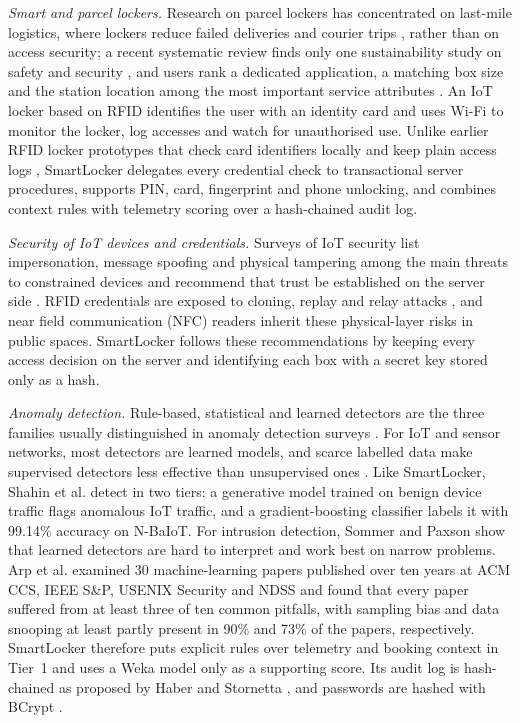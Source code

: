 \documentclass[journal,onecolumn]{IEEEtran}
\begin{document}
\textit{Smart and parcel lockers.} Research on parcel lockers has concentrated on last-mile logistics, where lockers
reduce failed deliveries and courier trips \cite{iwan2016parcel}, rather than on access security; a recent systematic
review finds only one sustainability study on safety and security \cite{zhang2025parcel}, and users rank a dedicated
application, a matching box size and the station location among the most important service attributes
\cite{ciesla2023parcel}. An IoT
locker based on RFID \cite{rfidiot2023locker} identifies the user with an identity card and uses Wi-Fi to monitor the
locker, log accesses and watch for unauthorised use. Unlike earlier RFID locker prototypes that check card identifiers
locally and keep plain access logs \cite{rfidiot2023locker}, SmartLocker delegates every credential check to
transactional server procedures, supports PIN, card, fingerprint and phone unlocking, and combines context rules with
telemetry scoring over a hash-chained audit log.

\textit{Security of IoT devices and credentials.} Surveys of IoT security list impersonation, message spoofing and
physical tampering among the main threats to constrained devices \cite{roman2013features} and recommend that trust be
established on the server side \cite{sicari2015security}. RFID credentials are exposed to cloning, replay and relay
attacks \cite{mitrokotsa2010rfid}, and near field communication (NFC) readers inherit these physical-layer risks in
public spaces. SmartLocker follows these recommendations by keeping every
access decision on the server and identifying each box with a secret key stored only as a hash.

\textit{Anomaly detection.} Rule-based, statistical and learned detectors are the three families usually distinguished
in anomaly detection surveys \cite{chandola2009anomaly}. For IoT and sensor networks, most detectors are learned
models, and scarce labelled data make supervised detectors less effective than unsupervised ones
\cite{demedeiros2023anomaly}. Like SmartLocker, Shahin et al. \cite{shahin2025twostage} detect in two
tiers: a generative model trained on benign device traffic flags anomalous IoT traffic, and a gradient-boosting
classifier labels it with 99.14\% accuracy on N-BaIoT. For intrusion detection, Sommer and Paxson
\cite{sommer2010outside} show that learned detectors are hard to interpret and work best on narrow problems. Arp et
al. \cite{arp2022dos} examined 30 machine-learning papers published over ten years at ACM CCS, IEEE S\&P, USENIX
Security and NDSS and found that every paper suffered from at least three of ten common pitfalls, with sampling bias
and data snooping at least partly present in 90\% and 73\% of the papers, respectively. SmartLocker therefore puts
explicit rules over telemetry and booking context in Tier~1 and uses a Weka model \cite{hall2009weka} only as a
supporting score. Its audit log is hash-chained as proposed by Haber and Stornetta \cite{haber1991timestamp}, and
passwords are hashed with BCrypt \cite{provos1999bcrypt}.
\end{document}
